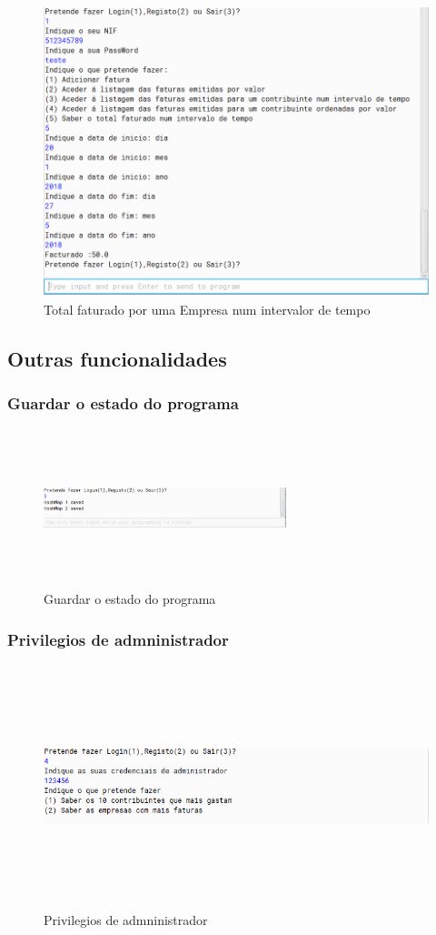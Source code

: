 \documentclass[a4paper]{article}
\begin{document}
			\begin{figure}[H]
				\centering
				\includegraphics[width = 320pt,height = 240pt]{totalfaturadoempresa.png}
				\caption{Total faturado por uma Empresa num intervalor de tempo}
			\end{figure}
			
	\subsection{Outras funcionalidades}
		\subsubsection{Guardar o estado do programa}
			\begin{figure}[H]
				\centering
				\includegraphics[width = 200pt,height = 130pt]{savestate.png}
				\caption{Guardar o estado do programa}
			\end{figure}
		\subsubsection{Privilegios de admninistrador}
			\begin{figure}[H]
				\centering
				\includegraphics[width = 320pt,height = 200pt]{admin.png}
				\caption{Privilegios de admninistrador}
			\end{figure}
\end{document}
